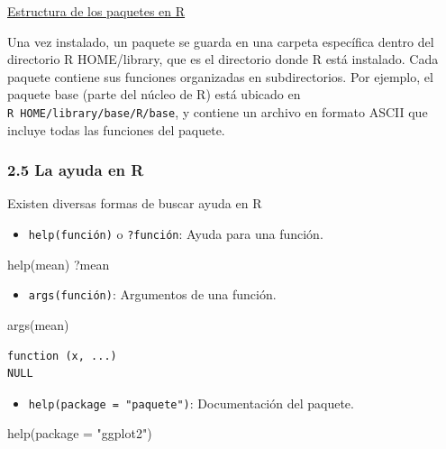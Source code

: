 \documentclass[
  letterpaper,
  DIV=11,
  numbers=noendperiod]{scrartcl}
\newenvironment{Shaded}{\begin{snugshade}}{\end{snugshade}}
\newcommand{\AttributeTok}[1]{\textcolor[rgb]{0.40,0.45,0.13}{#1}}
\newcommand{\FunctionTok}[1]{\textcolor[rgb]{0.28,0.35,0.67}{#1}}
\newcommand{\NormalTok}[1]{\textcolor[rgb]{0.00,0.23,0.31}{#1}}
\newcommand{\StringTok}[1]{\textcolor[rgb]{0.13,0.47,0.30}{#1}}
\providecommand{\tightlist}{%
  \setlength{\itemsep}{0pt}\setlength{\parskip}{0pt}}\usepackage{longtable,booktabs,array}
\begin{document}
\uline{Estructura de los paquetes en R}

Una vez instalado, un paquete se guarda en una carpeta específica dentro
del directorio R HOME/library, que es el directorio donde R está
instalado. Cada paquete contiene sus funciones organizadas en
subdirectorios. Por ejemplo, el paquete base (parte del núcleo de R)
está ubicado en \texttt{R\ HOME/library/base/R/base}, y contiene un
archivo en formato ASCII que incluye todas las funciones del paquete.

\hypertarget{la-ayuda-en-r}{%
\subsubsection{2.5 La ayuda en R}\label{la-ayuda-en-r}}

Existen diversas formas de buscar ayuda en R

\begin{itemize}
\tightlist
\item
  \texttt{help(función)} o \texttt{?función}: Ayuda para una función.
\end{itemize}

\begin{Shaded}
\begin{Highlighting}[]
\FunctionTok{help}\NormalTok{(mean)}
\NormalTok{?mean}
\end{Highlighting}
\end{Shaded}

\begin{itemize}
\tightlist
\item
  \texttt{args(función)}: Argumentos de una función.
\end{itemize}

\begin{Shaded}
\begin{Highlighting}[]
\FunctionTok{args}\NormalTok{(mean)}
\end{Highlighting}
\end{Shaded}

\begin{verbatim}
function (x, ...) 
NULL
\end{verbatim}

\begin{itemize}
\tightlist
\item
  \texttt{help(package\ =\ "paquete")}: Documentación del paquete.
\end{itemize}

\begin{Shaded}
\begin{Highlighting}[]
\FunctionTok{help}\NormalTok{(}\AttributeTok{package =} \StringTok{"ggplot2"}\NormalTok{)}
\end{Highlighting}
\end{Shaded}
\end{document}
